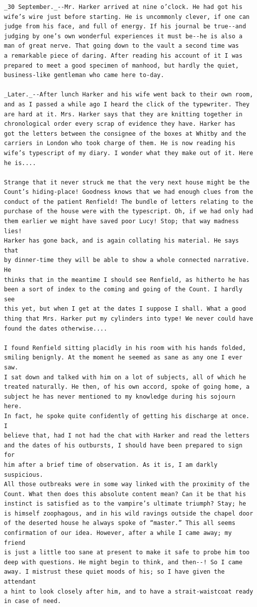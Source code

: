 \documentclass{article}
\begin{document}
\begin{verbatim}
_30 September._--Mr. Harker arrived at nine o’clock. He had got his
wife’s wire just before starting. He is uncommonly clever, if one can
judge from his face, and full of energy. If his journal be true--and
judging by one’s own wonderful experiences it must be--he is also a
man of great nerve. That going down to the vault a second time was
a remarkable piece of daring. After reading his account of it I was
prepared to meet a good specimen of manhood, but hardly the quiet,
business-like gentleman who came here to-day.

_Later._--After lunch Harker and his wife went back to their own room,
and as I passed a while ago I heard the click of the typewriter. They
are hard at it. Mrs. Harker says that they are knitting together in
chronological order every scrap of evidence they have. Harker has
got the letters between the consignee of the boxes at Whitby and the
carriers in London who took charge of them. He is now reading his
wife’s typescript of my diary. I wonder what they make out of it. Here
he is....

Strange that it never struck me that the very next house might be the
Count’s hiding-place! Goodness knows that we had enough clues from the
conduct of the patient Renfield! The bundle of letters relating to the
purchase of the house were with the typescript. Oh, if we had only had
them earlier we might have saved poor Lucy! Stop; that way madness lies!
Harker has gone back, and is again collating his material. He says that
by dinner-time they will be able to show a whole connected narrative. He
thinks that in the meantime I should see Renfield, as hitherto he has
been a sort of index to the coming and going of the Count. I hardly see
this yet, but when I get at the dates I suppose I shall. What a good
thing that Mrs. Harker put my cylinders into type! We never could have
found the dates otherwise....

I found Renfield sitting placidly in his room with his hands folded,
smiling benignly. At the moment he seemed as sane as any one I ever saw.
I sat down and talked with him on a lot of subjects, all of which he
treated naturally. He then, of his own accord, spoke of going home, a
subject he has never mentioned to my knowledge during his sojourn here.
In fact, he spoke quite confidently of getting his discharge at once. I
believe that, had I not had the chat with Harker and read the letters
and the dates of his outbursts, I should have been prepared to sign for
him after a brief time of observation. As it is, I am darkly suspicious.
All those outbreaks were in some way linked with the proximity of the
Count. What then does this absolute content mean? Can it be that his
instinct is satisfied as to the vampire’s ultimate triumph? Stay; he
is himself zoophagous, and in his wild ravings outside the chapel door
of the deserted house he always spoke of “master.” This all seems
confirmation of our idea. However, after a while I came away; my friend
is just a little too sane at present to make it safe to probe him too
deep with questions. He might begin to think, and then--! So I came
away. I mistrust these quiet moods of his; so I have given the attendant
a hint to look closely after him, and to have a strait-waistcoat ready
in case of need.



\end{verbatim}
\end{document}
